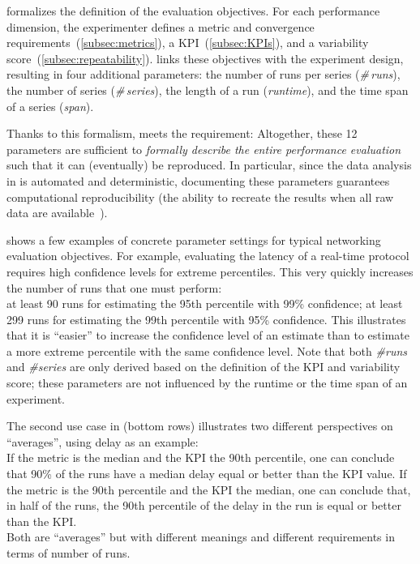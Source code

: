 \triscale formalizes the definition of the evaluation objectives. For each performance dimension, the experimenter defines a metric and convergence requirements~(\cref{subsec:metrics}), a KPI~(\cref{subsec:KPIs}), and a variability score~(\cref{subsec:repeatability}).
\triscale links these objectives with the experiment design, resulting in four additional parameters: the number of runs per series (\emph{\#\,runs}), the number of series (\emph{\#\,series}), the length of a run (\emph{runtime}), and the time span of a series (\emph{span}).

Thanks to this formalism, \triscale meets the  requirement:
Altogether, these 12 parameters are sufficient to \emph{formally describe the entire performance evaluation} such that it can (eventually) be reproduced.
In particular, since the data analysis in \triscale is automated and deterministic, documenting these parameters guarantees computational reproducibility (the ability to recreate the results when all raw data are available~\cite{liu19computational}).

 shows a few examples of concrete parameter settings for typical networking evaluation objectives.
For example, evaluating the latency of a real-time protocol requires high confidence levels for extreme percentiles.
This very quickly increases the number of runs that one must perform:\\
\inlineitem
  at least 90 runs for estimating the 95th percentile with 99\% confidence;\linebreak
\inlineitem
  at least 299 runs for estimating the 99th percentile with 95\% confidence.\linebreak
This illustrates that it is ``easier'' to increase the confidence level of an estimate than to estimate a more extreme percentile with the same confidence level.
Note that both \emph{\#runs} and \emph{\#series} are only derived based on the definition of the KPI and variability score; these parameters are not influenced by the runtime or the time span of an experiment.

The second use case in  (bottom rows) illustrates two different perspectives on ``averages'', using delay as an example:\\
\inlineitem
  If the metric is the median and the KPI the 90th percentile, one can conclude that 90\% of the runs have a median delay equal or better than the KPI value.\linebreak
\inlineitem
  If the metric is the 90th percentile and the KPI the median, one can conclude that, in half of the runs, the 90th percentile of the delay in the run is equal or better than the KPI.\\
Both are ``averages'' but with different meanings and different requirements in terms of number of runs.


